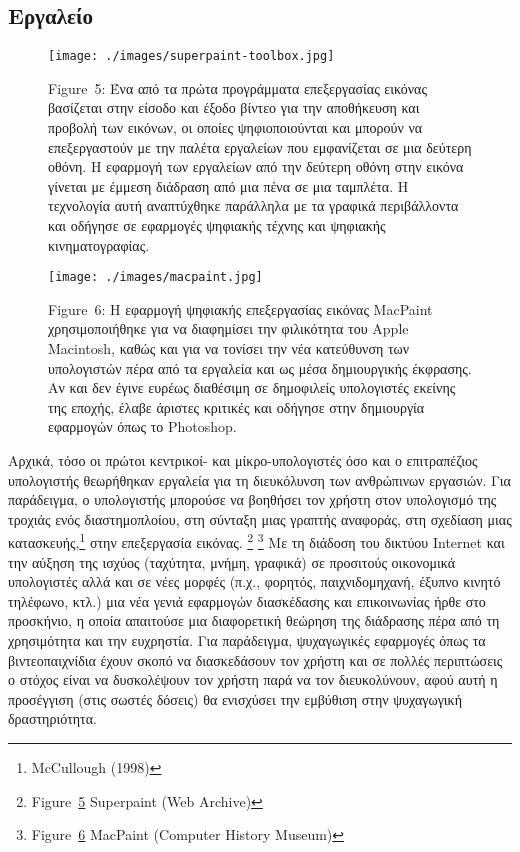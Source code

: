\documentclass[
]{article}
\begin{document}
\hypertarget{ux3b5ux3c1ux3b3ux3b1ux3bbux3b5ux3afux3bf}{%
\subsection{Εργαλείο}\label{ux3b5ux3c1ux3b3ux3b1ux3bbux3b5ux3afux3bf}}

\leavevmode{}%
\begin{figure}
\hypertarget{fig:superpaint-toolbox}{%
\centering
\texttt{[image: ./images/superpaint-toolbox.jpg]}
\caption{Figure~5: Ένα από τα πρώτα προγράμματα επεξεργασίας εικόνας
βασίζεται στην είσοδο και έξοδο βίντεο για την αποθήκευση και προβολή
των εικόνων, οι οποίες ψηφιοποιούνται και μπορούν να επεξεργαστούν με
την παλέτα εργαλείων που εμφανίζεται σε μια δεύτερη οθόνη. Η εφαρμογή
των εργαλείων από την δεύτερη οθόνη στην εικόνα γίνεται με έμμεση
διάδραση από μια πένα σε μια ταμπλέτα. Η τεχνολογία αυτή αναπτύχθηκε
παράλληλα με τα γραφικά περιβάλλοντα και οδήγησε σε εφαρμογές ψηφιακής
τέχνης και ψηφιακής κινηματογραφίας.}\label{fig:superpaint-toolbox}
}
\end{figure}

\leavevmode{}%
\begin{figure}
\hypertarget{fig:macpaint}{%
\centering
\texttt{[image: ./images/macpaint.jpg]}
\caption{Figure~6: Η εφαρμογή ψηφιακής επεξεργασίας εικόνας MacPaint
χρησιμοποιήθηκε για να διαφημίσει την φιλικότητα του Apple Macintosh,
καθώς και για να τονίσει την νέα κατεύθυνση των υπολογιστών πέρα από τα
εργαλεία και ως μέσα δημιουργικής έκφρασης. Αν και δεν έγινε ευρέως
διαθέσιμη σε δημοφιλείς υπολογιστές εκείνης της εποχής, έλαβε άριστες
κριτικές και οδήγησε στην δημιουργία εφαρμογών όπως το
Photoshop.}\label{fig:macpaint}
}
\end{figure}

Αρχικά, τόσο οι πρώτοι κεντρικοί- και μίκρο-υπολογιστές όσο και ο
επιτραπέζιος υπολογιστής θεωρήθηκαν εργαλεία για τη διευκόλυνση των
ανθρώπινων εργασιών. Για παράδειγμα, ο υπολογιστής μπορούσε να βοηθήσει
τον χρήστη στον υπολογισμό της τροχιάς ενός διαστημοπλοίου, στη σύνταξη
μιας γραπτής αναφοράς, στη σχεδίαση μιας κατασκευής,\footnote{McCullough
  (1998)} στην επεξεργασία εικόνας. \footnote{Figure~\protect\hyperlink{fig:superpaint-toolbox}{5}
  Superpaint (Web Archive)} \footnote{Figure~\protect\hyperlink{fig:macpaint}{6}
  MacPaint (Computer History Museum)} Με τη διάδοση του δικτύου Internet
και την αύξηση της ισχύος (ταχύτητα, μνήμη, γραφικά) σε προσιτούς
οικονομικά υπολογιστές αλλά και σε νέες μορφές (π.χ., φορητός,
παιχνιδομηχανή, έξυπνο κινητό τηλέφωνο, κτλ.) μια νέα γενιά εφαρμογών
διασκέδασης και επικοινωνίας ήρθε στο προσκήνιο, η οποία απαιτούσε μια
διαφορετική θεώρηση της διάδρασης πέρα από τη χρησιμότητα και την
ευχρηστία. Για παράδειγμα, ψυχαγωγικές εφαρμογές όπως τα βιντεοπαιχνίδια
έχουν σκοπό να διασκεδάσουν τον χρήστη και σε πολλές περιπτώσεις ο
στόχος είναι να δυσκολέψουν τον χρήστη παρά να τον διευκολύνουν, αφού
αυτή η προσέγγιση (στις σωστές δόσεις) θα ενισχύσει την εμβύθιση στην
ψυχαγωγική δραστηριότητα.
\end{document}
